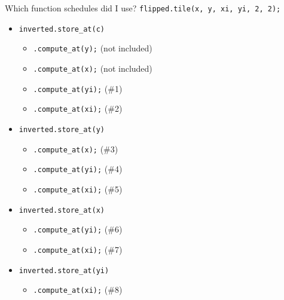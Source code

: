 \documentclass[xcolor=dvipsnames]{beamer}
\begin{document}
\begin{frame}{Which function schedules did I use?}
	\texttt{flipped.tile(x, y, xi, yi, 2, 2);}
	\pause
	\linegap

	\begin{itemize}
		\item \texttt{inverted.store\_at(c)}
		\begin{itemize}
			\item \texttt{.compute\_at(y);} (not included)
			\item \texttt{.compute\_at(x);} (not included)
			\item \texttt{.compute\_at(yi);} (\#1)
			\item \texttt{.compute\_at(xi);} (\#2)
		\end{itemize}
		\item \texttt{inverted.store\_at(y)}
		\begin{itemize}
			\item \texttt{.compute\_at(x);} (\#3)
			\item \texttt{.compute\_at(yi);} (\#4)
			\item \texttt{.compute\_at(xi);} (\#5)
		\end{itemize}
		\item \texttt{inverted.store\_at(x)}
		\begin{itemize}
			\item \texttt{.compute\_at(yi);} (\#6)
			\item \texttt{.compute\_at(xi);} (\#7)
		\end{itemize}
		\item \texttt{inverted.store\_at(yi)}
		\begin{itemize}
			\item \texttt{.compute\_at(xi);} (\#8)
		\end{itemize}
	\end{itemize}
	
\end{frame}
\end{document}
